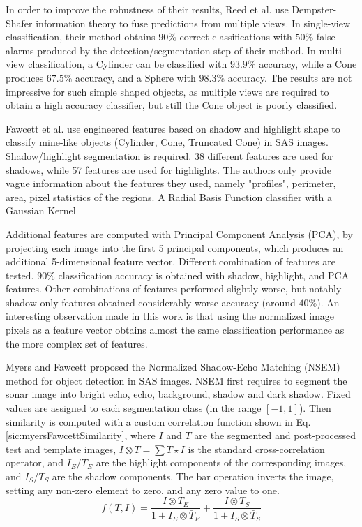 In order to improve the robustness of their results, Reed et al. \cite[-7em]{reed2004automated} use Dempster-Shafer information theory to fuse predictions from multiple views. In single-view classification, their method obtains $90 \%$ correct classifications with $50 \%$ false alarms produced by the detection/segmentation step of their method.
In multi-view classification, a Cylinder can be classified with $93.9 \%$ accuracy, while a Cone produces $67.5 \%$ accuracy, and a Sphere with $98.3 \%$ accuracy.
The results are not impressive for such simple shaped objects, as multiple views are required to obtain a high accuracy classifier, but still the Cone object is poorly classified.

Fawcett et al. \cite{fawcett2007computer} use engineered features based on shadow and highlight shape to classify mine-like objects (Cylinder, Cone, Truncated Cone) in SAS images. Shadow/highlight segmentation is required. 38 different features are used for shadows, while 57 features are used for highlights. The authors only provide vague information about the features they used, namely "profiles", perimeter, area, pixel statistics of the regions. A  Radial Basis Function classifier with a Gaussian Kernel

Additional features are computed with Principal Component Analysis (PCA), by projecting each image into the first 5 principal components, which produces an additional 5-dimensional feature vector. Different combination of features are tested. $90 \%$ classification accuracy is obtained with shadow, highlight, and PCA features. Other combinations of features performed slightly worse, but notably shadow-only features obtained considerably worse accuracy (around $40 \%$). An interesting observation made in this work is that using the normalized image pixels as a feature vector obtains almost the same classification performance as the more complex set of features.

Myers and Fawcett \cite{myers2010template} proposed the Normalized Shadow-Echo Matching (NSEM) method for object detection in SAS images. NSEM first requires to segment the sonar image into bright echo, echo, background, shadow and dark shadow. Fixed values are assigned to each segmentation class (in the range $[-1, 1]$).
Then similarity is computed with a custom correlation function shown in Eq. \ref{sic:myersFawcettSimilarity}, where $I$ and $T$ are the segmented and post-processed test and template images, $I \otimes T = \sum T \star I$ is the standard cross-correlation operator, and $I_E$/$T_E$ are the highlight components of the corresponding images, and $I_S$/$T_S$ are the shadow components. The bar operation inverts the image, setting any non-zero element to zero, and any zero value to one.
\vspace*{1em}
\begin{equation}
	f(T, I) = \frac{I \otimes T_E}{1 + I_E \otimes \bar{T}_E} + \frac{I \otimes T_S}{1 + I_S \otimes \bar{T}_S}
	\label{sic:myersFawcettSimilarity}
\end{equation}

